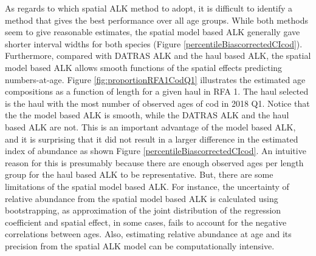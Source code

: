 \documentclass[a4paper 12pt]{article}
\numberwithin{equation}{section}
\begin{document}
{As regards to which spatial ALK method to adopt, it is difficult to identify a method that gives the best performance over all age groups. While both methods seem to give reasonable estimates, the spatial model based ALK generally gave shorter interval widths for both species (Figure \ref{percentileBiascorrectedCIcod}). Furthermore, compared with DATRAS ALK and the haul based ALK, the spatial model based ALK allows smooth functions of the spatial effects predicting numbers-at-age. Figure \ref{fig:proportionRFA1CodQ1} illustrates the estimated age compositions as a function of length for a given haul in RFA 1. The haul selected is the haul with the most number of observed ages of cod in 2018 Q1. Notice that the the model based ALK is smooth, while the DATRAS ALK and the haul based ALK are not. This is an important advantage of the model based ALK, and it is surprising that it did not result in a larger difference in the estimated index of abundance as shown Figure \ref{percentileBiascorrectedCIcod}. An intuitive reason for this is presumably because there are enough observed ages per length group for the haul based ALK to be representative. But, there are some limitations of the spatial model based ALK. For instance, the uncertainty of relative abundance from the spatial model based ALK is calculated using bootstrapping, as approximation of the joint distribution of the regression coefficient and spatial effect, in some cases, fails to account for the  negative correlations between ages. Also, estimating relative abundance at age and its precision from the spatial ALK model can be computationally intensive. 

}
\end{document}
